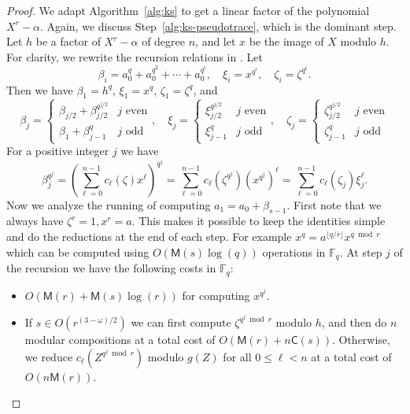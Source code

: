 \documentclass[12pt]{article}
\theoremstyle{plain}
\theoremstyle{definition}
\def\F{\ensuremath{\mathbb{F}}}
\def\MM{\ensuremath{\mathsf{M}}}
\def\CC{\ensuremath{\mathsf{C}}}
\begin{document}
\begin{proof}
We adapt Algorithm~\ref{alg:ks} to get a linear factor of the polynomial $X^r-\alpha$. 
Again, we discuss Step~\ref{alg:ks-pseudotrace}, which is the dominant 
step. Let $h$ be a factor of $X^r-\alpha$ of degree $n$, and let $x$ be the image of $X$ modulo 
$h$. For clarity, we rewrite the recursion relations in \cite{kaltofen+shoup97}. Let
\[ \beta_i = a_0^q + a_0^{q^2} + \cdots + a_0^{q^i}, \quad \xi_i = x^{q^i}, \quad \zeta_i = \zeta^{q^i}. \]
Then we have $\beta_1 = h^q$, $\xi_1 = x^q$, $\zeta_1 = \zeta^q$, and
\[
\beta_j = 
\begin{cases}
\beta_{j / 2} + \beta_{j / 2}^{q^{j / 2}} & j \text{ even} \\
\beta_1 + \beta_{j - 1}^q & j \text{ odd}
\end{cases}, \quad
\xi_j = 
\begin{cases}
\xi_{j / 2}^{q^{j / 2}} & j \text{ even} \\
\xi_{j - 1}^q & j \text{ odd}
\end{cases}, \quad
\zeta_j = 
\begin{cases}
\zeta_{j / 2}^{q^{j / 2}} & j \text{ even} \\
\zeta_{j - 1}^q & j \text{ odd}
\end{cases}
\]
For a positive integer $j$ we have
\begin{equation}
\label{equation:betaj}
\beta_j^{q^j} = \left( \sum_{\ell = 0}^{n - 1}c_\ell(\zeta)x^\ell \right)^{q^j} = \sum_{\ell = 0}^{n - 
	1}c_\ell(\zeta^{q^j})(x^{q^j})^\ell = \sum_{\ell = 0}^{n - 1}c_\ell(\zeta_j)\xi_j^\ell.
\end{equation}
Now we analyze the running of computing $a_1 = a_0 + \beta_{s - 1}$. First note that we always 
have $\zeta^r = 1, x^r = a$. This makes it possible to keep the identities simple and do the reductions 
at the end of each step. For example $x^q = a^{\lfloor q / r\rfloor}x^{q \bmod r}$ which can be 
computed using $O(\MM(s)\log(q))$ operations in $\F_q$. At step $j$ of the recursion we have the 
following costs in $\F_q$:
\begin{itemize}
	\item $O(\MM(r) + \MM(s)\log(r))$ for computing $x^{q^j}$.
	\item If $s \in O(r^{(3 - \omega) / 2})$ we can first compute $\zeta^{q^j \bmod r}$ modulo $h$, 
	and then do $n$ modular compositions at a total cost of $O(\MM(r) + n\CC(s))$. Otherwise, we  
	reduce $c_\ell(Z^{q^j \bmod r})$ modulo $g(Z)$ for all $0 \le \ell < n$ at a total cost of 
	$O(n\MM(r))$.

\end{itemize}
\end{proof}
\end{document}
